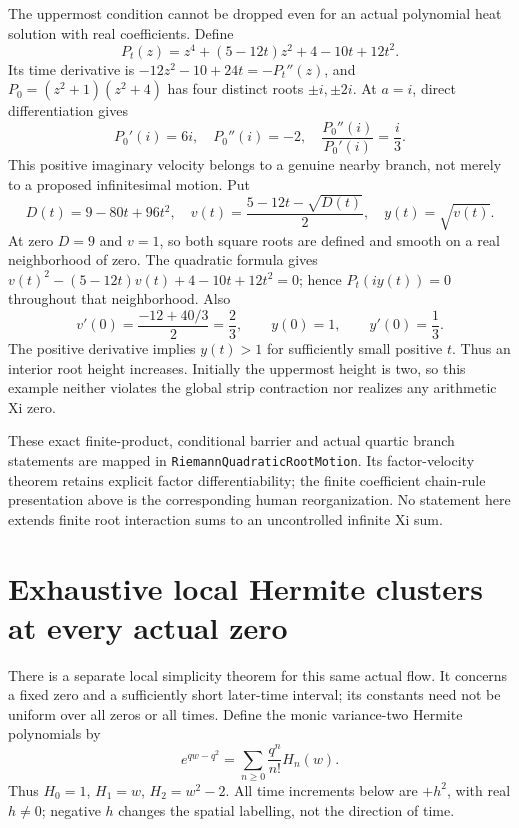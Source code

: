 \documentclass[11pt]{article}
\newcommand{\code}[1]{{\small\nolinkurl{#1}}}
\begin{document}
The uppermost condition cannot be dropped even for an actual polynomial
heat solution with real coefficients. Define
\begin{equation}\label{eq:upwardquartic}
 P_t(z)=z^4+(5-12t)z^2+4-10t+12t^2.
\end{equation}
Its time derivative is $-12z^2-10+24t=-P_t''(z)$, and
$P_0=(z^2+1)(z^2+4)$ has four distinct roots $\pm i,\pm2i$.
At $a=i$, direct differentiation gives
\[
 P_0'(i)=6i,\quad P_0''(i)=-2,\quad
 \frac{P_0''(i)}{P_0'(i)}=\frac i3.
\]
This positive imaginary velocity belongs to a genuine nearby branch,
not merely to a proposed infinitesimal motion. Put
\[
 D(t)=9-80t+96t^2,\quad
 v(t)=\frac{5-12t-\sqrt{D(t)}}2,\quad y(t)=\sqrt{v(t)}.
\]
At zero $D=9$ and $v=1$, so both square roots are defined and smooth
on a real neighborhood of zero. The quadratic formula gives
$v(t)^2-(5-12t)v(t)+4-10t+12t^2=0$; hence
$P_t(iy(t))=0$ throughout that neighborhood. Also
\[
 v'(0)=\frac{-12+40/3}{2}=\frac23,
 \qquad y(0)=1,\qquad y'(0)=\frac13.
\]
The positive derivative implies $y(t)>1$ for sufficiently small
positive $t$. Thus an interior root height increases. Initially the
uppermost height is two, so this example neither violates the global
strip contraction nor realizes any arithmetic Xi zero.

These exact finite-product, conditional barrier and actual quartic
branch statements are mapped in \code{RiemannQuadraticRootMotion}.
Its factor-velocity theorem retains explicit factor differentiability;
the finite coefficient chain-rule presentation above is the corresponding
human reorganization. No statement here extends finite root interaction
sums to an uncontrolled infinite Xi sum.


\section{Exhaustive local Hermite clusters at every actual zero}
\label{sec:hermitecluster}
There is a separate local simplicity theorem for this same actual flow.
It concerns a fixed zero and a sufficiently short later-time interval;
its constants need not be uniform over all zeros or all times.
Define the monic variance-two Hermite polynomials by
\begin{equation}\label{eq:hermitegen}
 e^{qw-q^2}=\sum_{n\geq0}\frac{q^n}{n!}H_n(w).
\end{equation}
Thus $H_0=1$, $H_1=w$, $H_2=w^2-2$. All time increments below
are $+h^2$, with real $h\ne0$; negative $h$ changes the spatial
labelling, not the direction of time.
\end{document}
